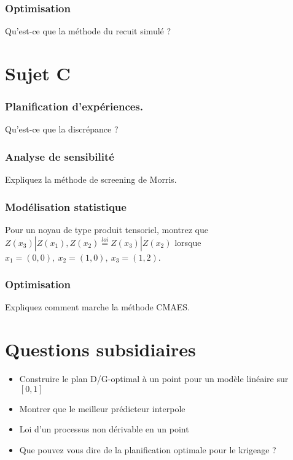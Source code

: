 \documentclass{article}
\begin{document}
\subsubsection*{Optimisation}
Qu'est-ce que la méthode du recuit simulé ?
\vspace{1cm}
\hline
\newpage

\hline
\section*{Sujet C}
\subsubsection*{Planification d'expériences.}
Qu'est-ce que la discrépance ?

\subsubsection*{Analyse de sensibilité}
Expliquez la méthode de screening de Morris.

\subsubsection*{Modélisation statistique}
Pour un noyau de type produit tensoriel, montrez que $Z(x_3)|Z(x_1),Z(x_2) \stackrel{loi}{=} Z(x_3)|Z(x_2)$ lorsque $x_1=(0,0),\ x_2=(1,0),\ x_3=(1,2)$.

\subsubsection*{Optimisation}
Expliquez comment marche la méthode CMAES.

\vspace{1cm}
\hline
\vspace{3cm}

\section*{Questions subsidiaires}
\begin{itemize}
	\item Construire le plan D/G-optimal à un point pour un modèle linéaire sur $[0,1]$
	\item Montrer que le meilleur prédicteur interpole
	\item Loi d'un processus non dérivable en un point
	\item Que pouvez vous dire de la planification optimale pour le krigeage ?

\end{itemize}
\end{document}
